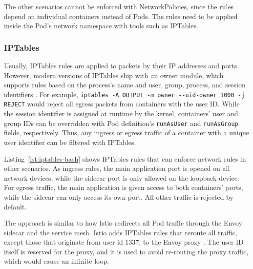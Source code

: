 \documentclass[english, 12pt, a4paper, sci, utf8, a-2b, online]{aaltothesis}
\begin{document}


The other scenarios cannot be enforced with NetworkPolicies, since the rules depend on individual containers instead of Pods.
The rules need to be applied inside the Pod's network namespace with tools such as IPTables.

\subsubsection{IPTables}

Usually, IPTables rules are applied to packets by their IP addresses and ports.
However, modern versions of IPTables ship with an owner module, which supports rules based on the process's name and user, group, process, and session identifiers \cite{iptables-manpage}.
For example, \lstinline{iptables -A OUTPUT -m owner --uid-owner 1000 -j REJECT} would reject all egress packets from containers with the user ID.
While the session identifier is assigned at runtime by the kernel, containers' user and group IDs can be overridden with Pod definition's \lstinline{runAsUser} and \lstinline{runAsGroup} fields, respectively.
Thus, any ingress or egress traffic of a container with a unique user identifier can be filtered with IPTables.

Listing~\ref{lst:iptables-bash} shows IPTables rules that can enforce network rules in other scenarios.
As ingress rules, the main application port is opened on all network devices, while the sidecar port is only allowed on the loopback device.
For egress traffic, the main application is given access to both containers' ports, while the sidecar can only access its own port.
All other traffic is rejected by default.



The approach is similar to how Istio redirects all Pod traffic through the Envoy sidecar and the service mesh.
Istio adds IPTables rules that reroute all traffic, except those that originate from user id 1337, to the Envoy proxy \cite{istio-iptables}.
The user ID itself is reserved for the proxy, and it is used to avoid re-routing the proxy traffic, which would cause an infinite loop.
\end{document}
